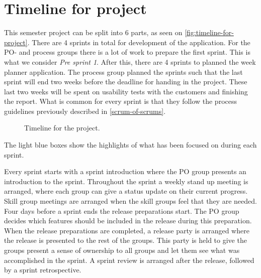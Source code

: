 \section{Timeline for project}
This semester project can be split into 6 parts, as seen on \autoref{fig:timeline-for-project}.
There are 4 sprints in total for development of the application. 
For the PO- and process groups there is a lot of work to prepare the first sprint.
This is what we consider \textit{Pre sprint 1}.
After this, there are 4 sprints to planned the week planner application.
The process group planned the sprints such that the last sprint will end two weeks before the deadline for handing in the project.
These last two weeks will be spent on usability tests with the customers and finishing the report.
What is common for every sprint is that they follow the process guidelines previously described in \autoref{scrum-of-scrums}.

\begin{figure}[H]
    \caption{\label{fig:timeline-for-project} Timeline for the project.}
\end{figure}

\noindent The light blue boxes show the highlights of what has been focused on during each sprint.

\noindent Every sprint starts with a sprint introduction where the PO group presents an introduction to the sprint.
Throughout the sprint a weekly stand up meeting is arranged, where each group can give a status update on their current progress.
Skill group meetings are arranged when the skill groups feel that they are needed.\\
Four days before a sprint ends the release preparations start.
The PO group decides which features should be included in the release during this preparation.
When the release preparations are completed, a release party is arranged where the release is presented to the rest of the groups.
This party is held to give the groups present a sense of ownership to all groups and let them see what was accomplished in the sprint. 
A sprint review is arranged after the release, followed by a sprint retrospective.

